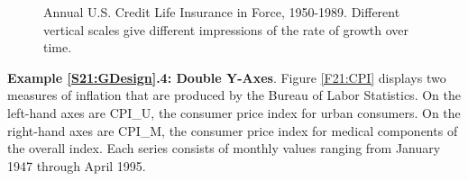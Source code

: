 \begin{figure}[htp]
  \begin{center}  \hfill
    \caption{\label{F21:InsurInForce} \small Annual U.S. Credit Life Insurance in Force, 1950-1989. Different
vertical scales give different impressions of the rate of growth
over time.}
  \end{center}
\end{figure}

\newpage


\linejed

\textbf{Example \ref{S21:GDesign}.4: Double Y-Axes}. Figure
\ref{F21:CPI} displays two measures of inflation that are produced
by the Bureau of Labor Statistics. On the left-hand axes are CPI\_U,
the consumer price index for urban consumers. On the right-hand axes
are CPI\_M, the consumer price index for medical components of the
overall index. Each series consists of monthly values ranging from
January 1947 through April 1995.

